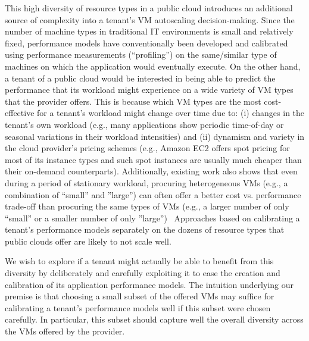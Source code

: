 This high diversity of resource types in a public cloud introduces an additional source of complexity into a tenant's %
VM autoscaling decision-making. Since the number of machine types in traditional IT environments is small and relatively fixed, performance models have conventionally been developed and calibrated using performance measurements (``profiling'') on the same/similar type of machines on which the application would eventually execute. On the other hand, a tenant of a public cloud would be interested in being able to predict the performance that its workload might experience on a wide variety of VM types that the provider offers. This is because which VM types are the most cost-effective for a tenant's workload might change over time due to: (i) changes in the tenant's own workload (e.g., many applications show periodic time-of-day or seasonal variations in their workload intensities) and (ii) dynamism and variety in the cloud provider's pricing schemes (e.g., Amazon EC2 offers spot pricing for most of its instance types and such spot instances are usually much cheaper than their on-demand counterparts). Additionally, existing work also shows that even during a period of stationary workload, procuring heterogeneous VMs (e.g., a combination of ``small'' and ''large'') can often offer a better cost vs. performance trade-off than procuring the same types of VMs (e.g., a larger number of only ``small'' or a smaller number of only ''large'')~\cite{Zhang15}
Approaches based on calibrating a tenant's performance models separately on the dozens of resource types that public clouds offer are likely to not scale well.

We wish to explore if a tenant might actually be able to benefit from this diversity by deliberately and carefully exploiting it to ease the creation and calibration of its application performance models. The intuition underlying our premise is that choosing a small subset of the offered VMs may suffice for calibrating a tenant's performance models well if this subset were chosen carefully. In particular, this subset should capture well the overall diversity across the VMs offered by the provider. 


